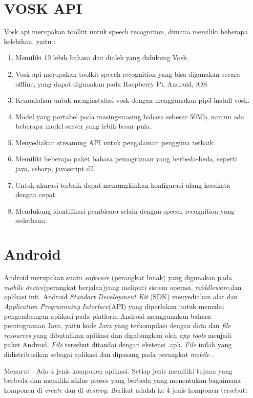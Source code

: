 \section{VOSK API}
Vosk api merupakan toolkit untuk speech recognition, dimana memiliki beberapa kelebihan, yaitu \citep{cephei2019}:
\begin{enumerate}
\item Memiliki 19 lebih bahasa dan dialek yang didukung Vosk.
\item Vosk api merupakan toolkit speech recognition yang bisa digunakan secara offline, yang dapat digunakan pada Raspberry Pi, Android, iOS.
\item Kemudahan untuk menginstalasi vosk dengan menggunakan pip3 install vosk.
\item Model yang portabel pada masing-masing bahasa sebesar 50Mb, namun ada beberapa model server yang lebih besar pula.
\item Menyediakan streaming API untuk pengalaman pengguna terbaik.
\item Memiliki beberapa paket bahasa pemograman yang berbeda-beda, seperti java, csharp, javascript dll.
\item Untuk akurasi terbaik dapat memungkinkan konfigurasi ulang kosakata dengan cepat.
\item Mendukung identifikasi pembicara selain dengan speech recognition yang sederhana.

\end{enumerate}

\section{Android}
Android merupakan suatu \textit{software} (perangkat lunak) yang digunakan pada \textit{mobile device}(perangkat berjalan)yang meliputi sistem operasi, \textit{middleware},dan aplikasi inti. Android \textit{Standart Development Kit} (SDK) menyediakan alat dan \textit{Application Programming Interface}(API) yang diperlukan untuk memulai pengembangan aplikasi pada platform Android menggunakan bahasa pemrograman Java, yaitu kode Java yang terkompilasi dengan data dan \textit{file resources} yang dibutuhkan aplikasi dan digabungkan oleh \textit{app tools} menjadi paket Android. \textit{File} tersebut ditandai dengan ekstensi .apk. \textit{File} inilah yang didistribusikan sebagai aplikasi dan dipasang pada perangkat \textit{mobile} \citep{nasution2018perancangan}.

\par Menurut \citep{shaheen2017android}. Ada 4 jenis komponen aplikasi. Setiap jenis memiliki tujuan yang berbeda dan memiliki siklus proses yang berbeda yang menentukan bagaimana komponen di \textit{create} dan di \textit{destroy}. Berikut adalah ke 4 jenis komponen tersebut:

